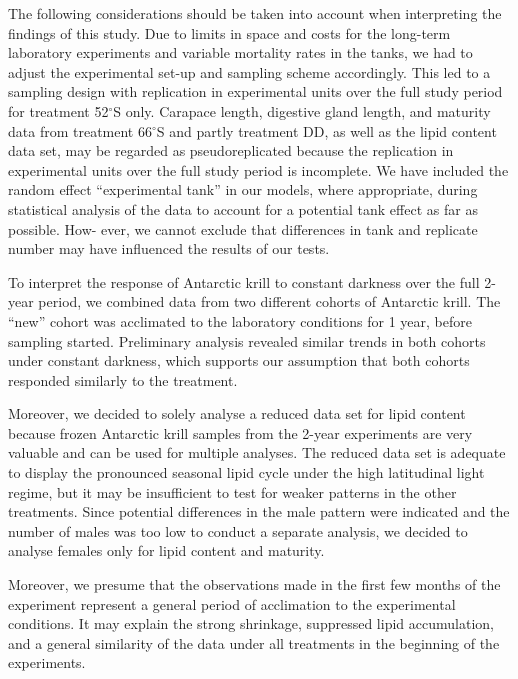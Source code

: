 The following considerations should be taken into account when interpreting the
findings of this study. Due to limits in space and costs for the long-term
laboratory experiments and variable mortality rates in the tanks, we had to
adjust the experimental set-up and sampling scheme accordingly. This led to a
sampling design with replication in experimental units over the full study
period for treatment 52$^{\circ}$S only. Carapace length, digestive gland
length, and maturity data from treatment 66$^{\circ}$S and partly treatment DD,
as well as the lipid content data set, may be regarded as pseudoreplicated
\citep{colegrave_using_2018} because the replication in experimental units over
the full study period is incomplete. We have included the random effect
“experimental tank” in our models, where appropriate, during statistical
analysis of the data to account for a potential tank effect as far as possible.
How- ever, we cannot exclude that differences in tank and replicate number may
have influenced the results of our tests. 

To interpret the response of Antarctic krill to constant darkness over the full
2-year period, we combined data from two different cohorts of Antarctic krill.
The “new” cohort was acclimated to the laboratory conditions for 1 year, before
sampling started. Preliminary analysis revealed similar trends in both cohorts
under constant darkness, which supports our assumption that both cohorts
responded similarly to the treatment. 

Moreover, we decided to solely analyse a reduced data set for lipid content
because frozen Antarctic krill samples from the 2-year experiments are very
valuable and can be used for multiple analyses. The reduced data set is
adequate to display the pronounced seasonal lipid cycle under the high
latitudinal light regime, but it may be insufficient to test for weaker
patterns in the other treatments. Since potential differences in the male
pattern were indicated and the number of males was too low to conduct a
separate analysis, we decided to analyse females only for lipid content and
maturity. 

Moreover, we presume that the observations made in the first few months of the
experiment represent a general period of acclimation to the experimental
conditions. It may explain the strong shrinkage, suppressed lipid accumulation,
and a general similarity of the data under all treatments in the beginning of
the experiments. 

